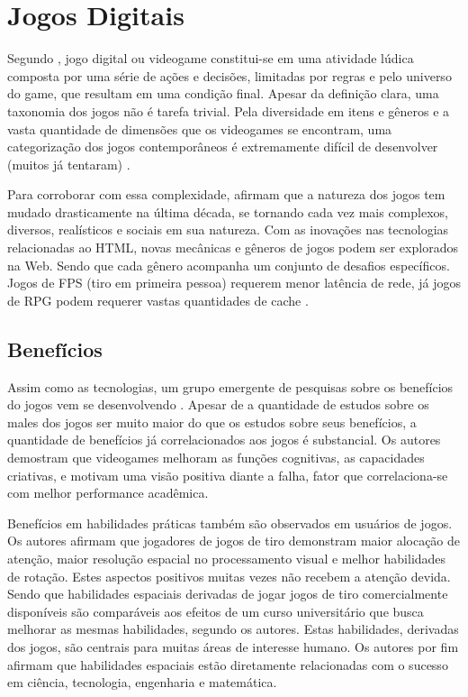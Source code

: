 \section{Jogos Digitais}

Segundo \citet{indieGamesLemes}, jogo digital ou videogame constitui-se em uma
atividade lúdica composta por uma série de ações e decisões,
limitadas por regras e pelo universo do game, que resultam em uma
condição final. Apesar da definição clara, uma taxonomia dos jogos
não é tarefa trivial. Pela diversidade em itens e gêneros e a
vasta quantidade de dimensões que os videogames se encontram, uma
categorização dos jogos contemporâneos é extremamente difícil de
desenvolver (muitos já tentaram) \autocite[p. 60]{gamebenefits}.

Para corroborar com essa complexidade, \citet{gamebenefits} afirmam
que a natureza dos jogos tem mudado drasticamente na última década,
se tornando cada vez mais complexos, diversos, realísticos e sociais
em sua natureza. Com as inovações nas tecnologias relacionadas ao
HTML, novas mecânicas e gêneros de jogos podem ser explorados na Web.
Sendo que cada gênero acompanha um conjunto de desafios específicos.
Jogos de FPS (tiro em primeira pessoa) requerem menor latência de
rede, já jogos de RPG podem requerer vastas quantidades de cache
\autocite{html5mostwanted}.

\subsection{Benefícios}

Assim como as tecnologias, um grupo emergente de pesquisas sobre os
benefícios do jogos vem se desenvolvendo \citet{gamebenefits}. Apesar
de a quantidade de estudos sobre os males dos jogos ser muito maior
do que os estudos sobre seus benefícios, a quantidade de benefícios
já correlacionados aos jogos é substancial. Os autores demostram que
videogames melhoram as funções cognitivas, as capacidades criativas, e
motivam uma visão positiva diante a falha, fator que correlaciona-se com
melhor performance acadêmica.

Benefícios em habilidades práticas também são observados em
usuários de jogos. Os autores afirmam que jogadores de jogos de tiro demonstram maior
alocação de atenção, maior resolução espacial no processamento
visual e melhor habilidades de rotação.
Estes aspectos positivos muitas vezes não recebem a atenção devida.
Sendo que habilidades espaciais derivadas de jogar jogos de tiro comercialmente
disponíveis são comparáveis aos efeitos de um curso universitário
que busca melhorar as mesmas habilidades, segundo os autores. Estas
habilidades, derivadas dos jogos, são centrais para muitas áreas de
interesse humano. Os autores por fim afirmam que habilidades espaciais
estão diretamente relacionadas com o sucesso em ciência, tecnologia,
engenharia e matemática.

